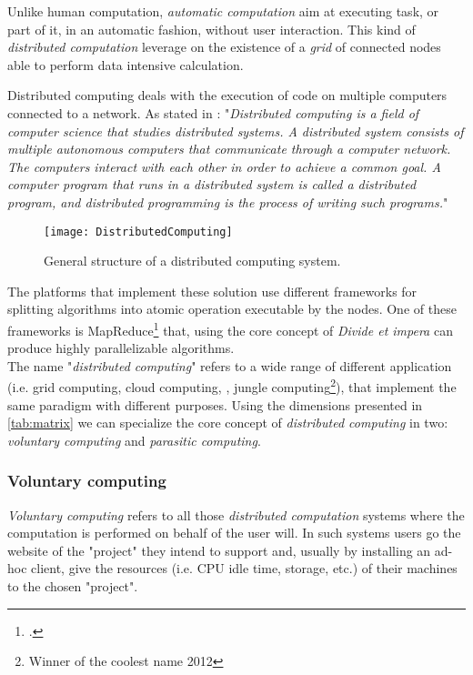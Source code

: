 
Unlike human computation, \emph{automatic computation} aim at executing task, or
part of it, in an automatic fashion, without user interaction. This kind of
\emph{distributed computation} leverage on the existence of a \emph{grid} of
connected nodes able to perform data intensive calculation.


Distributed computing deals with the execution of code on multiple computers
connected to a network. As stated in \cite{andrewsfoundations}: "\emph{Distributed
computing is a field of computer science that studies distributed systems. A
distributed system consists of multiple autonomous computers that communicate
through a computer network. The computers interact with each other in order to
achieve a common goal. A computer program that runs in a distributed system is
called a distributed program, and distributed programming is the process of
writing such programs.}"
\begin{figure}[htb]
    \centering
    \texttt{[image: DistributedComputing]}
    \caption{General structure of a distributed computing system.}
    \label{fig:distributed-computing}
\end{figure}

The platforms that implement these solution use different frameworks for splitting
algorithms into atomic operation executable by the nodes. One of these frameworks
is MapReduce\footcite{dean2008mapreduce} that, using the core concept of
\emph{Divide et impera} can produce highly parallelizable algorithms.\\

The name "\emph{distributed computing}" refers to a wide range of different
application (i.e. grid computing, cloud computing,
, jungle computing\footnote{Winner of the
coolest name 2012}), that implement the same paradigm with different purposes.
Using the dimensions presented in \autoref{tab:matrix} we can specialize the
core concept of \emph{distributed computing} in two: \emph{voluntary computing}
and \emph{parasitic computing}.


\subsubsection{Voluntary computing}
\label{sec:bg:crowd:auto:voluntary}
\emph{Voluntary computing} refers to all those \emph{distributed computation}
systems where the computation is performed on behalf of the user will. In such
systems users go the website of the "project" they intend to support and, usually
by installing an ad-hoc client, give the resources (i.e. CPU idle time, storage,
etc.) of their machines to the chosen "project".\\

